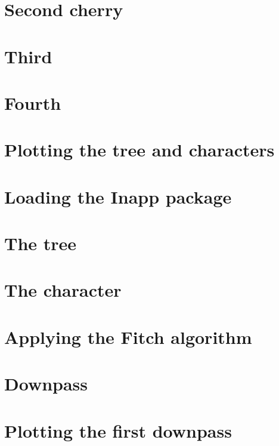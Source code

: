 \documentclass[]{book}
\theoremstyle{definition}
\theoremstyle{definition}
\theoremstyle{definition}
\theoremstyle{remark}
\begin{document}
\hypertarget{second-cherry-1}{%
\section{Second cherry}\label{second-cherry-1}}

\hypertarget{third-1}{%
\section{Third}\label{third-1}}

\hypertarget{fourth-1}{%
\section{Fourth}\label{fourth-1}}

\hypertarget{plotting-the-tree-and-characters}{%
\section{Plotting the tree and
characters}\label{plotting-the-tree-and-characters}}

\hypertarget{loading-the-inapp-package}{%
\section{Loading the Inapp package}\label{loading-the-inapp-package}}

\hypertarget{the-tree}{%
\section{The tree}\label{the-tree}}

\hypertarget{the-character}{%
\section{The character}\label{the-character}}

\hypertarget{applying-the-fitch-algorithm}{%
\section{Applying the Fitch
algorithm}\label{applying-the-fitch-algorithm}}

\hypertarget{downpass}{%
\section{Downpass}\label{downpass}}

\hypertarget{plotting-the-first-downpass}{%
\section{Plotting the first
downpass}\label{plotting-the-first-downpass}}
\end{document}
